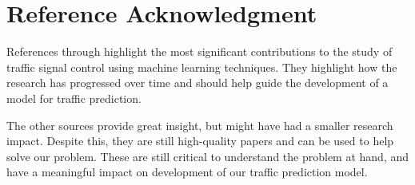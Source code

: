 \documentclass[conference]{IEEEtran}
\begin{document}
\section*{Reference Acknowledgment}
References \cite{1} through \cite{15} highlight the most significant contributions to the study of traffic signal control using machine learning techniques. They highlight how the research has progressed over time and should help guide the development of a model for traffic prediction. 

The other sources provide great insight, but might have had a smaller research impact. Despite this, they are still high-quality papers and can be used to help solve our problem. These are still critical to understand the problem at hand, and have a meaningful impact on development of our traffic prediction model. 
\end{document}
